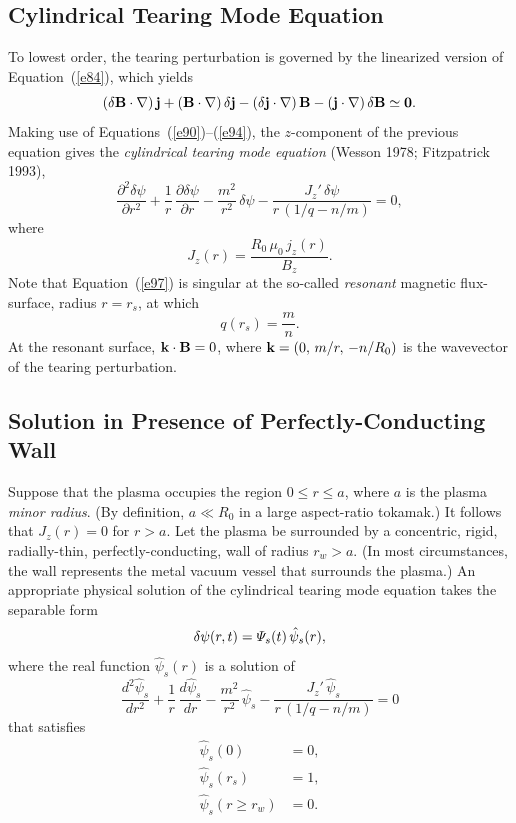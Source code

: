 \documentclass[notitlepage,12pt]{article}
\begin{document}
\subsection{Cylindrical Tearing Mode Equation}
To lowest order, the tearing perturbation is governed by the linearized version of Equation~(\ref{e84}), which yields
\begin{equation}\label{e96}
(\delta{\bf B}\cdot \nabla)\,{\bf j} + ({\bf B}\cdot\nabla)\,\delta{\bf j} - (\delta{\bf j}\cdot\nabla)\,{\bf B} - 
({\bf j}\cdot\nabla)\,\delta {\bf B}\simeq {\bf 0}.
\end{equation}
Making use of Equations~(\ref{e90})--(\ref{e94}), the $z$-component of the previous equation gives
the {\em cylindrical tearing mode equation}\/ (Wesson 1978; Fitzpatrick 1993),
\begin{equation}\label{e97}
\frac{\partial^2\delta\psi}{\partial r^2} + \frac{1}{r}\,\frac{\partial\delta\psi}{\partial r}-\frac{m^2}{r^2}\,\delta\psi - \frac{J_z'\,\delta\psi}{r\,(1/q-n/m)}=  0,
\end{equation}
where 
\begin{equation}
J_z(r)= \frac{R_0\,\mu_0\,j_z(r)}{B_z}.
\end{equation}
Note that Equation~(\ref{e97}) is singular at the so-called {\em resonant}\/ magnetic flux-surface, radius $r=r_s$, at which 
\begin{equation}\label{e104}
q(r_s)= \frac{m}{n}.
\end{equation}
At the resonant surface, ${\bf k}\cdot{\bf B}=0$, where ${\bf k} = (0,\,m/r,\,-n/R_0)$ is the wavevector of the tearing perturbation. 

\subsection{Solution in Presence of Perfectly-Conducting Wall}\label{perfect}
Suppose that the plasma occupies the region $0\leq r\leq a$, where $a$ is the plasma {\em minor radius}. (By definition, $a\ll R_0$ in a large aspect-ratio tokamak.) It follows that
$J_z(r)=0$ for $r>a$. Let the plasma be surrounded by a concentric, rigid, radially-thin, perfectly-conducting, wall of radius $r_w>a$. 
(In most circumstances, the wall represents the metal vacuum vessel that surrounds  the plasma.) An appropriate
physical solution of the cylindrical tearing mode equation takes the separable form
\begin{equation}\label{e99}
\delta\psi(r,t)= {\mit\Psi}_s(t)\,\hat{\psi}_s(r),
\end{equation}
where the real function $\hat{\psi}_s(r)$ is a solution of 
\begin{equation}\label{e100}
\frac{d^2\hat{\psi}_s}{dr^2} + \frac{1}{r}\,\frac{d\hat{\psi}_s}{dr}-\frac{m^2}{r^2}\,\hat{\psi}_s - \frac{J_z'\,\hat{\psi}_s}{r\,(1/q-n/m)}= 0
\end{equation}
that satisfies
\begin{align}\label{e101}
\hat{\psi}_s(0) &= 0,\\[0.5ex]
\hat{\psi}_s(r_s) &= 1,\label{e102}\\[0.5ex]
\hat{\psi}_s(r\geq r_w) &= 0.\label{e103}
\end{align}
\end{document}
